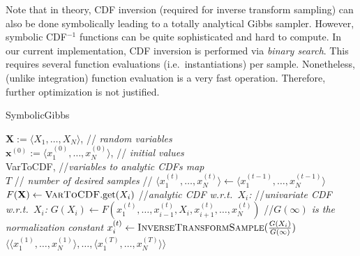 \documentclass{article}
\newcommand{\tuple}[1] {\langle #1 \rangle}
\newcommand{\bvec}[1]{\textbf{#1}}
\begin{document}
Note that in theory, CDF inversion (required for inverse transform sampling)
can also be done symbolically leading to a totally analytical Gibbs sampler.
However, symbolic CDF$^{-1}$ functions can be quite sophisticated and hard to compute. 
In our current implementation, CDF inversion is performed via \emph{binary search}. This requires several function evaluations (i.e.\ instantiations) per sample. Nonetheless, (unlike integration) function evaluation is a very fast operation. Therefore, further optimization is not justified.    




\begin{algorithm}[hb!]%
\caption{{\sc SymbolicGibbs}  
\label{alg:symbolic-gibbs}}
\begin{algorithmic}
{$\bvec{X} := \tuple{X_1, \ldots, X_N}$, 				\hspace*{\fill}// \emph{\small random variables} \\
 $\bvec{x}^{(0)} := \tuple{x_1^{(0)}, \ldots, x_N^{(0)}}$, 	\hspace*{\fill}// \emph{\small initial values} \\
{\sc VarToCDF}, 								\hspace*{\fill}//\emph{\small variables to analytic CDFs map} \\
 $T$ 										\hspace*{\fill}// \emph{\small number of desired samples } }
//%
{\small
	 \STATE $\tuple{x_1^{(t)}, \ldots, x_N^{(t)}} \leftarrow \tuple{x_1^{(t-1)}, \ldots, x_N^{(t-1)}}$    
	\FOR{ {\bf each} $X_i \in \bvec{X}$}
		\STATE $F(\bvec{X}) \leftarrow \textsc{VarToCDF}.\text{get}(X_i)$ //\emph{analytic CDF w.r.t.\ $X_i$:}
		\STATE //\emph{univariate CDF w.r.t.\ $X_i$:}
		\STATE 	$G(X_i) \leftarrow F(x_1^{(t)}, \ldots, x_{i-1}^{(t)}, X_i, x_{i+1}^{(t)}, \ldots, x_N^{(t)})$ 
		\STATE //\emph{$G(\infty)$ is the normalization constant}
		\STATE $x_i^{(t)} \leftarrow \textsc{InverseTransformSample}(\frac{G(X_i)}{G(\infty)})$
	\ENDFOR %
\ENDFOR %
 {$\big\langle
			\tuple{x_1^{(1)}, \ldots, x_N^{(1)}}, \ldots, 
			\tuple{x_1^{(T)}, \ldots, x_N^{(T)}}
		\big\rangle$}\;
%	
} %
\end{algorithmic}
\end{algorithm}
\end{document}
